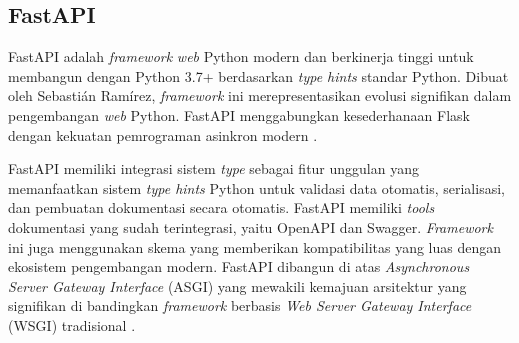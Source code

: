 \subsection{FastAPI}
\label{subsec:fastapi}

FastAPI adalah \emph{framework} \emph{web} Python modern dan berkinerja tinggi untuk membangun \api{} dengan Python 3.7+ berdasarkan \emph{type hints} standar Python. Dibuat oleh Sebastián Ramírez, \emph{framework} ini merepresentasikan evolusi signifikan dalam pengembangan \emph{web} Python. FastAPI menggabungkan kesederhanaan Flask dengan kekuatan pemrograman asinkron modern \parencite{ramirez2020fastapi}.

FastAPI memiliki integrasi sistem \emph{type} sebagai fitur unggulan yang memanfaatkan sistem \emph{type hints} Python untuk validasi data otomatis, serialisasi, dan pembuatan dokumentasi secara otomatis. FastAPI memiliki \emph{tools} dokumentasi yang sudah terintegrasi, yaitu OpenAPI dan Swagger. \emph{Framework} ini juga menggunakan skema \json{} yang memberikan kompatibilitas yang luas dengan ekosistem pengembangan modern. FastAPI dibangun di atas \emph{Asynchronous Server Gateway Interface} (ASGI) yang mewakili kemajuan arsitektur yang signifikan di bandingkan \emph{framework} berbasis \emph{Web Server Gateway Interface} (WSGI) tradisional \parencite{ramirez2020fastapi}. 




